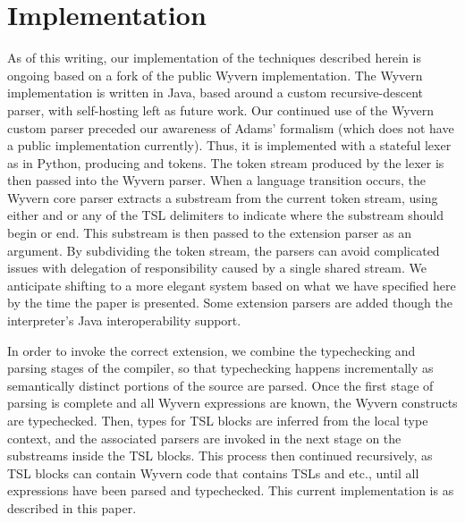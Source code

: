 
\section{Implementation}
\label{s:implementation}
As of this writing, our implementation of the techniques described herein is ongoing based on a fork of the public Wyvern implementation. The Wyvern implementation is written in Java, based around a custom recursive-descent parser, with self-hosting left as future work. Our continued use of the Wyvern custom parser preceded our awareness of Adams' formalism (which does not have a public implementation currently). Thus, it is implemented with a stateful lexer as in Python, producing  and  tokens. The token stream produced by the lexer is then passed into the Wyvern parser. When a language transition occurs, the Wyvern core parser extracts a substream from the current token stream, using either  and  or any of the TSL delimiters to indicate where the substream should begin or end. This substream is then passed to the extension parser as an argument. By subdividing the token stream, the parsers can avoid complicated issues with delegation of responsibility caused by a single shared stream. We anticipate shifting to a more elegant system based on what we have specified here by the time the paper is presented. 
Some extension parsers are added though the interpreter's Java interoperability support.

In order to invoke the correct extension, we combine the typechecking and parsing stages of the compiler, so that typechecking happens incrementally as semantically distinct portions of the source are parsed. Once the first stage of parsing is complete and all Wyvern expressions are known, the Wyvern constructs are typechecked. Then, types for TSL blocks are inferred from the local type context, and the associated parsers are invoked in the next stage on the substreams inside the TSL blocks. This process then continued recursively, as TSL blocks can contain Wyvern code that contains TSLs and etc., until all expressions have been parsed and typechecked. This current implementation is as described in this paper.